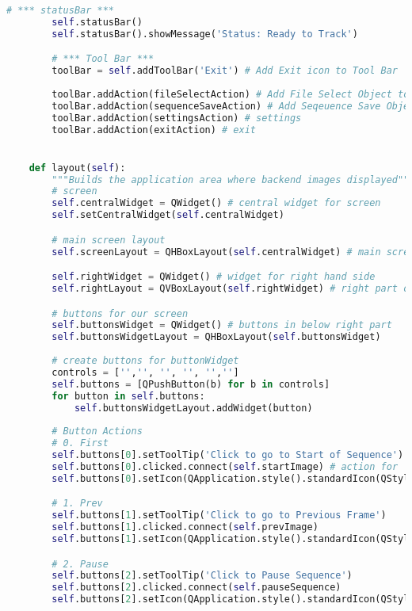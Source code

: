 \begin{lstlisting}[language=Python, caption={GUI Impementation Code}, captionpos=b, label={lst:gui}]
        # *** statusBar ***
        self.statusBar()
        self.statusBar().showMessage('Status: Ready to Track')

        # *** Tool Bar ***
        toolBar = self.addToolBar('Exit') # Add Exit icon to Tool Bar  
        
        toolBar.addAction(fileSelectAction) # Add File Select Object to Tool Bar
        toolBar.addAction(sequenceSaveAction) # Add Seqeuence Save Object to Tool Bar
        toolBar.addAction(settingsAction) # settings
        toolBar.addAction(exitAction) # exit


    def layout(self):
        """Builds the application area where backend images displayed"""
        # screen
        self.centralWidget = QWidget() # central widget for screen
        self.setCentralWidget(self.centralWidget)

        # main screen layout
        self.screenLayout = QHBoxLayout(self.centralWidget) # main screen

        self.rightWidget = QWidget() # widget for right hand side
        self.rightLayout = QVBoxLayout(self.rightWidget) # right part of screen

        # buttons for our screen
        self.buttonsWidget = QWidget() # buttons in below right part
        self.buttonsWidgetLayout = QHBoxLayout(self.buttonsWidget)
        
        # create buttons for buttonWidget
        controls = ['','', '', '', '','']
        self.buttons = [QPushButton(b) for b in controls]
        for button in self.buttons:
            self.buttonsWidgetLayout.addWidget(button)
        
        # Button Actions
        # 0. First
        self.buttons[0].setToolTip('Click to go to Start of Sequence')
        self.buttons[0].clicked.connect(self.startImage) # action for 'start' button
        self.buttons[0].setIcon(QApplication.style().standardIcon(QStyle.SP_MediaSkipBackward))

        # 1. Prev
        self.buttons[1].setToolTip('Click to go to Previous Frame')
        self.buttons[1].clicked.connect(self.prevImage)
        self.buttons[1].setIcon(QApplication.style().standardIcon(QStyle.SP_MediaSeekBackward))

        # 2. Pause
        self.buttons[2].setToolTip('Click to Pause Sequence')
        self.buttons[2].clicked.connect(self.pauseSequence)
        self.buttons[2].setIcon(QApplication.style().standardIcon(QStyle.SP_MediaPause))


\end{lstlisting}
